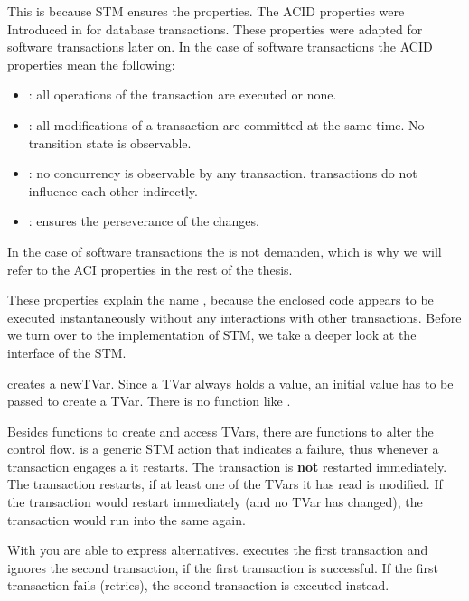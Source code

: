 This is because STM ensures the  properties. The ACID properties were Introduced in \parencite{DBTrans} for
database transactions. These properties were adapted for software transactions later on.
In the case of software transactions the ACID properties mean the following:
\begin{itemize}
 \item {}: all operations of the transaction are executed or none.
 \item {}: all modifications of a transaction are committed at the same time. No transition state is observable.
 \item {}: no concurrency is observable by any transaction. transactions do not influence each other indirectly.
 \item {}: ensures the perseverance of the changes.
\end{itemize}
In the case of software transactions the  is not demanden, which is why we will refer to the ACI properties
in the rest of the thesis.

These properties explain the name , because the enclosed code appears to be executed instantaneously without any 
interactions with other transactions.
Before we turn over to the implementation of STM, we take a deeper look at the interface of the STM.

 creates a newTVar. Since a TVar always holds a value, an initial value has to be
passed to create a TVar. There is no function like . 

Besides functions to create and access TVars, there are functions to alter the control flow.
 is a generic STM action that indicates a failure, thus whenever a transaction engages a  it restarts. The transaction
is \textbf{not} restarted immediately. The transaction restarts, if at least one of the TVars it has read is modified. If the transaction would
restart immediately (and no TVar has changed), the transaction would run into the same  again. 

With  you are able to express alternatives.  executes the first transaction
and ignores the second transaction, if the first transaction is successful. If the first transaction fails (retries), the second transaction is 
executed instead.

